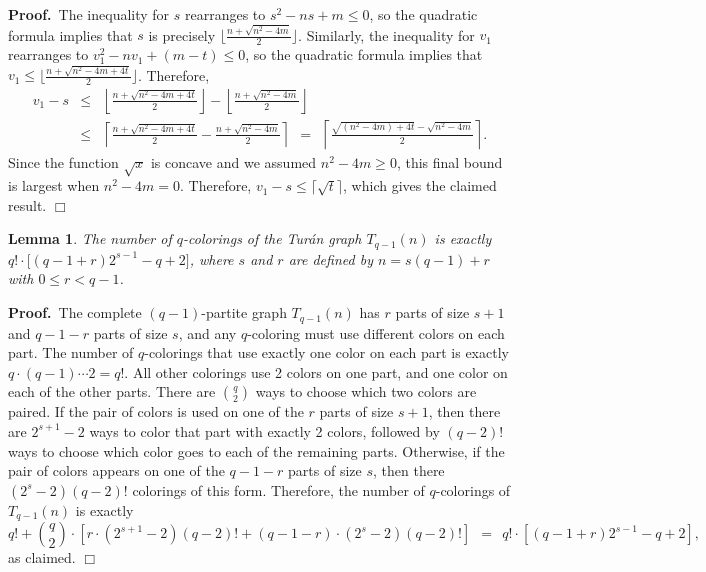 \documentclass[11pt]{article}
\newtheorem{lemma}[theorem]{Lemma}
\begin{document}
\noindent \textbf{Proof.}\, The inequality for $s$ rearranges to $s^2
- ns + m \leq 0$, so the quadratic formula implies that $s$ is
precisely $\big\lfloor \frac{n + \sqrt{n^2 - 4m}}{2} \big\rfloor$.
Similarly, the inequality for $v_1$ rearranges to $v_1^2 - n v_1 +
(m-t) \leq 0$, so the quadratic formula implies that $v_1 \leq
\big\lfloor \frac{n + \sqrt{n^2 - 4m + 4t}}{2} \big\rfloor$.
Therefore,
\begin{eqnarray*}
  v_1 - s &\leq& \left\lfloor \frac{n + \sqrt{n^2 - 4m + 4t}}{2} \right\rfloor
  - \left\lfloor \frac{n + \sqrt{n^2 - 4m}}{2} \right\rfloor \\
  &\leq& \left\lceil \frac{n + \sqrt{n^2 - 4m + 4t}}{2} 
    - \frac{n + \sqrt{n^2 - 4m}}{2} \right\rceil 
  \ \ = \ \ \left\lceil \frac{\sqrt{(n^2 - 4m) + 4t}
    - \sqrt{n^2 - 4m}}{2} \right\rceil.
\end{eqnarray*}
Since the function $\sqrt{x}$ is concave and we assumed $n^2 - 4m \geq
0$, this final bound is largest when $n^2 - 4m = 0$.  Therefore, $v_1
- s \leq \lceil \sqrt{t} \rceil$, which gives the claimed result.
\hfill $\Box$




\vspace{3mm}



\begin{lemma}
  \label{lem:turan-number-colorings}
  The number of $q$-colorings of the Tur\'an graph $T_{q-1}(n)$ is
  exactly $q! \cdot \big[ (q-1+r)2^{s-1} - q + 2 \big]$, where $s$ and
  $r$ are defined by $n = s(q-1) + r$ with $0 \leq r < q-1$.
\end{lemma}

\noindent \textbf{Proof.}\, The complete $(q-1)$-partite graph
$T_{q-1}(n)$ has $r$ parts of size $s+1$ and $q-1-r$ parts of size
$s$, and any $q$-coloring must use different colors on each part.  The
number of $q$-colorings that use exactly one color on each part is
exactly $q \cdot (q-1) \cdots 2 = q!$.  All other colorings use 2
colors on one part, and one color on each of the other parts.  There
are ${q \choose 2}$ ways to choose which two colors are paired.  If
the pair of colors is used on one of the $r$ parts of size $s+1$, then
there are $2^{s+1} - 2$ ways to color that part with exactly 2 colors,
followed by $(q-2)!$ ways to choose which color goes to each of the
remaining parts.  Otherwise, if the pair of colors appears on one of
the $q-1-r$ parts of size $s$, then there $(2^s - 2) (q-2)!$ colorings
of this form.  Therefore, the number of $q$-colorings of $T_{q-1}(n)$
is exactly
\begin{displaymath}
  q! + {q \choose 2} \cdot \left[r \cdot (2^{s+1} - 2) (q-2)! +
    (q-1-r) \cdot (2^s - 2) (q-2)! \right] 
  \ \ = \ \  q! \cdot \left[ (q-1+r)2^{s-1} - q + 2 \right],
\end{displaymath}
as claimed.  \hfill $\Box$
\end{document}
